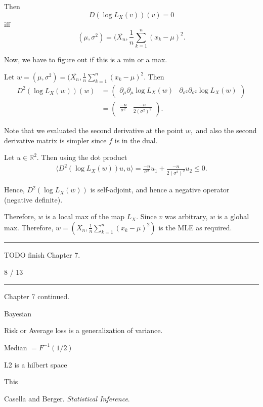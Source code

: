 \documentclass[12pt, reqno]{amsart}
\numberwithin{equation}{section}
\newcommand{\R}{\mathbb{R}}
\newcommand{\mean}{\overline}
\begin{document}
Then 
\[
D(\log L_X(v)) (v) = 0
\]
iff
\[
(\mu, \sigma^2) = ( \mean{X_n}, \frac{1}{n} \sum_{k = 1}^n (x_k - \mu)^2.
\]

Now, we have to figure out if this is a min or a max.

Let $w = (\mu, \sigma^2) = ( \mean{X_n}, \frac{1}{n} \sum_{k = 1}^n (x_k - \mu)^2$.
Then
\begin{align*}
D^2(\log L_X(w)) (w)
&=  \begin{pmatrix}
\partial_{\mu}  \partial_{\mu} \log L_X(w)
&
\partial_{\sigma^2} \partial_{\sigma^2} \log L_X(w)
\end{pmatrix}
\\
&=  \begin{pmatrix}
\frac{-n}{\sigma^2}
& \frac{-n}{2 (\sigma^2)^2}
\end{pmatrix}.
\end{align*} 

Note that we evaluated the second derivative at the point $w,$ and also the second derivative matrix is simpler since $f$ is in the dual.

Let $u \in \R^2.$
Then using the dot product
\begin{align*}
\langle D^2(\log L_X(w)) u {,} u \rangle
= \frac{-n}{\sigma^2} u_1 + \frac{-n}{2 (\sigma^2)^2} u_2
\le 0.
\end{align*}

Hence, $D^2(\log L_X(w))$ is self-adjoint, and hence a negative operator (negative definite).

Therefore, $w$ is a local max of  the map $L_X.$ Since $v$ was arbitrary, $w$ is a global max. Therefore, $w = ( \mean{X_n}, \frac{1}{n} \sum_{k = 1}^n (x_k - \mu)^2)$ is the MLE as required.

\rule{\textwidth}{.5pt}

TODO finish Chapter 7.

8 / 13
\rule{\textwidth}{.5pt}

Chapter 7 continued.

Bayesian

Risk or Average loss is a generalization of variance.

Median $= F^{-1}(1/2)$

L2 is a hilbert space

This 
\begin{thebibliography}{1}

Casella and Berger. \textit{Statistical Inference}.
\end{thebibliography}
\end{document}
